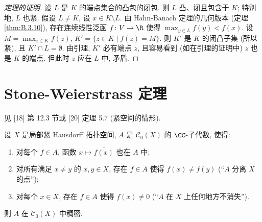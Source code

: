 \begin{proof}[定理的证明]
设 $L$ 是 $K$ 的端点集合的凸包的闭包. 则 $L$ 凸、闭且包含于 $K$; 特别地, $L$ 也紧. 假设 $L \neq K$, 设 $x \in K \setminus L$. 由 Hahn-Banach 定理的几何版本 (定理 \ref{thm:B.3.10}), 存在连续线性泛函 $f \colon V \to \R$ 使得 $\max_{y \in L}f(y) < f(x)$. 设 $M = \max_{z \in K}f(z)$, $K' = \{z \in K \mid f(z) = M\}$. 则 $K'$ 是 $K$ 的闭凸子集 (所以紧), 且 $K' \cap L = \emptyset$. 由引理, $K'$ 必有端点 $z$, 且容易看到 (如在引理的证明中) $z$ 也是 $K$ 的端点. 但此时 $z$ 应在 $L$ 中, 矛盾.
\end{proof}

\section{Stone-Weierstrass 定理}
见 {[}18{]} 第 12.3 节或 {[}20{]} 定理 5.7 (紧空间的情形).

\begin{theorem}
\label{thm:B.6.1}
设 $X$ 是局部紧 Hausdorff 拓扑空间, $A$ 是 $\mathcal{C}_0(X)$ 的 $\CC$-子代数, 使得:
\begin{enumerate}
\item[(a)] 对每个 $f \in A$, 函数 $x \longmapsto \overline{f(x)}$ 也在 $A$ 中;
\item[(b)] 对所有满足 $x \neq y$ 的 $x, y \in X$, 存在 $f \in A$ 使得 $f(x) \neq f(y)$ (``$A$ 分离 $X$ 的点'');
\item[(c)] 对每个 $x \in X$, 存在 $f \in A$ 使得 $f(x) \neq 0$ (``$A$ 在 $X$ 上任何地方不消失'').
\end{enumerate}
则 $A$ 在 $\mathcal{C}_0(X)$ 中稠密.
\end{theorem}
